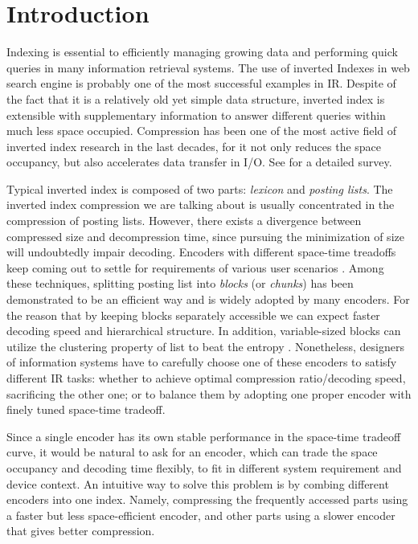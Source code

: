 \documentclass{sig-alternate-05-2015}
\begin{document}

\section{Introduction}\label{sec:intro}
Indexing is essential to efficiently managing growing data and performing quick queries in many information retrieval systems.
The use of inverted Indexes in web search engine is probably one of the most successful examples in IR.
Despite of the fact that it is a relatively old yet simple data structure, inverted index is extensible with supplementary information to answer different queries within much less space occupied.
Compression has been one of the most active field of inverted index research in the last decades, for it not only reduces the space occupancy, but also accelerates data transfer in I/O.
See \cite{catena2014inverted,trotman2014compression,zobel2006inverted} for a detailed survey.

Typical inverted index is composed of two parts: \textit{lexicon} and \textit{posting lists}.
The inverted index compression we are talking about is usually concentrated in the compression of posting lists.
However, there exists a divergence between compressed size and decompression time,
since pursuing the minimization of size will undoubtedly impair decoding.
Encoders with different space-time treadoffs keep coming out to settle for requirements of various user scenarios \cite{lemire2015decoding,ottaviano2015optimal,ottaviano2014partitioned,petri2014score,silvestri2010vsencoding}.
Among these techniques, splitting posting list into \textit{blocks} (or \textit{chunks}) has been demonstrated to be an efficient way and is widely adopted by many encoders.
For the reason that by keeping blocks separately accessible we can expect faster decoding speed and hierarchical structure.
In addition, variable-sized blocks can utilize the clustering property of list to beat the entropy \cite{moffat2000binary,silvestri2010vsencoding}.
Nonetheless, designers of information systems have to carefully choose one of these encoders to satisfy different IR tasks: whether to achieve optimal compression ratio/decoding speed, sacrificing the other one; or to balance them by adopting one proper encoder with finely tuned space-time tradeoff.

Since a single encoder has its own stable performance in the space-time tradeoff curve, it would be natural to ask for an encoder, which can trade the space occupancy and decoding time flexibly, to fit in different system requirement and device context.
An intuitive way to solve this problem is by combing different encoders into one index.
Namely, compressing the frequently accessed parts using a faster but less space-efficient encoder, and other parts using a slower encoder that gives better compression.
\end{document}
